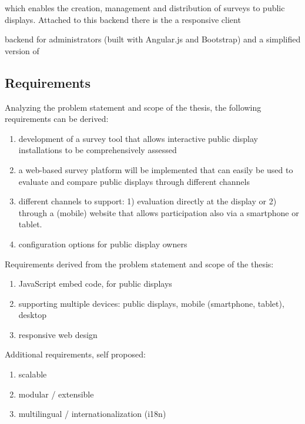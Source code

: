 which enables the creation, management and distribution of surveys to public displays. Attached to this backend there is the   a responsive client 

backend for administrators (built with Angular.js and Bootstrap) and a simplified version of 


\subsection{Requirements}
\label{4a_requirements}

Analyzing the problem statement and scope of the thesis, the following requirements can be derived:

\begin{enumerate}[itemsep=0pt] 
\item development of a survey tool that allows interactive public display installations to be comprehensively assessed 
\item a web-based survey platform will be implemented that can easily be used to evaluate and compare public displays through different channels 
\item different channels to support: 1) evaluation directly at
the display or 2) through a (mobile) website that allows participation also via a smartphone
or tablet.
\item configuration options for public display owners
\end{enumerate}


Requirements derived from the problem statement and scope of the thesis:

\begin{enumerate}
\item JavaScript embed code, for public displays
\item supporting multiple devices: public displays, mobile (smartphone, tablet), desktop
\item responsive web design
\end{enumerate}

Additional requirements, self proposed:
\begin{enumerate}
\item scalable
\item modular / extensible
\item multilingual / internationalization (i18n)
\end{enumerate}



\clearpage


\clearpage


\clearpage
